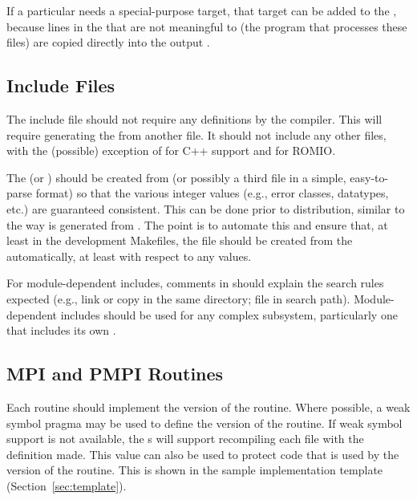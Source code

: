 \documentclass{article}
\begin{document}
If a particular  needs a special-purpose target, that target
can be added to the , because lines in the
 that are not meaningful to  (the
program that processes these 
files) are copied directly into the output .  

\subsection{Include Files}
The include file  should not require any 
definitions by the compiler.  This will require generating the
 from another file.
It should not include any other
files, with the (possible) exception of  for C++
support and  for ROMIO.

The  (or ) should be created from
 (or possibly a third file in a simple, easy-to-parse
format) so that the various integer values (e.g., error classes, 
datatypes, etc.) are guaranteed consistent.  This can be done prior to
distribution, similar to the way  is generated from
.  The point is to automate this and ensure that,
at least in the development Makefiles, the  file
should be created from the  automatically, at least with
respect to any values. 



For module-dependent includes, comments in  should explain the
search rules expected (e.g., link or copy in the same directory; file in
search path).  Module-dependent includes should be used for any complex
subsystem, particularly one that includes its own .

\subsection{MPI and PMPI Routines}
\label{sec:pmpi-routines}
Each routine should implement the  version of the routine.
Where possible, a weak symbol pragma may be used to define the
 version of the routine.  If weak symbol support is not
available, the s will support recompiling each file
with the definition  made.  This value
can also be used to protect code that is used by the 
version of the routine.  This is shown in the sample implementation template
(Section~\ref{sec:template}).
\end{document}
